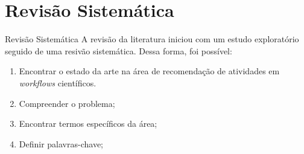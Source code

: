 \section{Revisão Sistemática}

\begin{frame}		
	\begin{block}{Revisão Sistemática}
		A revisão da literatura iniciou com um estudo exploratório seguido de uma resivão sistemática. Dessa forma, foi possível: 
		\begin{enumerate}
			\item Encontrar o estado da arte na área de recomendação de atividades em \emph{workflows} científicos.
			\item Compreender o problema;
			\item Encontrar termos específicos da área;
			\item Definir palavras-chave;
		\end{enumerate}
	\end{block}
\end{frame}

